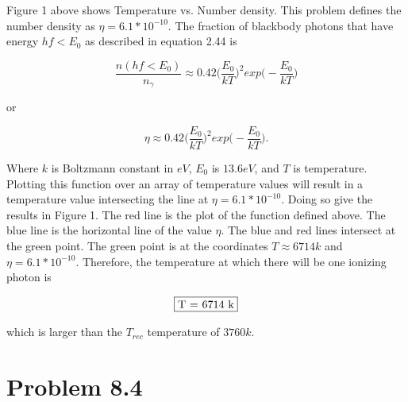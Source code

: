 \documentclass[12pt]{article}
\begin{document}
Figure 1 above shows Temperature vs. Number density. This problem defines the number density as $\eta = 6.1*10^{-10}$. The fraction of blackbody photons that have energy $hf < E_{0}$ as described in equation 2.44 is

$$
\frac{n(hf < E_{0})}{n_{\gamma}} \approx 0.42\Big(\frac{E_{0}}{kT}\Big)^{2}exp\Big(-\frac{E_{0}}{kT}\Big)
$$

or

$$
\eta \approx 0.42\Big(\frac{E_{0}}{kT}\Big)^{2}exp\Big(-\frac{E_{0}}{kT}\Big).
$$

Where $k$ is Boltzmann constant in $eV$, $E_{0}$ is $13.6 eV$, and $T$ is temperature. Plotting this function over an array of temperature values will result in a temperature value intersecting the line at $\eta = 6.1*10^{-10}$. Doing so give the results in Figure 1. The red line is the plot of the function defined above. The blue line is the horizontal line of the value $\eta$. The blue and red lines intersect at the green point. The green point is at the coordinates $T \approx 6714 k$ and $\eta = 6.1*10^{-10}$. Therefore, the temperature at which there will be one ionizing photon is

$$
\fbox{T = 6714 k}
$$

which is larger than the $T_{rec}$ temperature of $3760 k$.



\section*{Problem 8.4}

\end{document}
